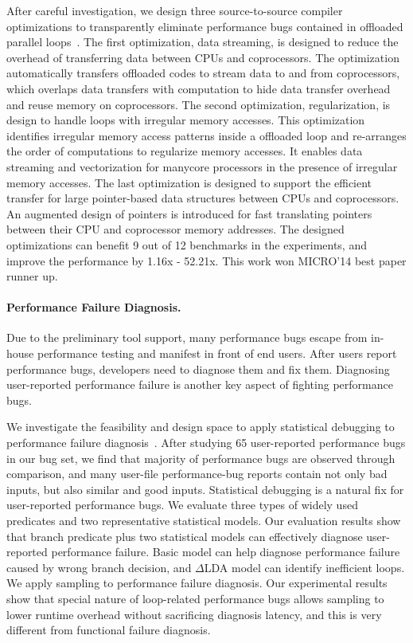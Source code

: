 \documentclass[10pt]{article}
\begin{document}
After careful investigation, we design three source-to-source compiler optimizations to 
transparently eliminate performance bugs contained in offloaded parallel loops~\cite{Song14MICRO}. 
The first optimization, data streaming, is designed to reduce the overhead of transferring data between CPUs and coprocessors. 
The optimization automatically transfers offloaded codes to stream data to and from coprocessors, which overlaps data transfers 
with computation to hide data transfer overhead and reuse memory on coprocessors. 
The second optimization, regularization, is design to handle loops with irregular memory accesses. 
This optimization identifies irregular memory access patterns inside a offloaded loop and re-arranges the order of computations to regularize memory accesses. 
It enables data streaming and vectorization for manycore processors in the presence of irregular memory accesses. 
The last optimization is designed to support the efficient transfer for large pointer-based data structures between CPUs and coprocessors. 
An augmented design of pointers is introduced for fast translating pointers between their CPU and coprocessor memory addresses. 
The designed optimizations can benefit 9 out of 12 benchmarks in the experiments, and improve the performance by 1.16x - 52.21x. 
This work won MICRO'14 best paper runner up. 




\paragraph{Performance Failure Diagnosis.}

Due to the preliminary tool support, many performance bugs escape from in-house performance testing and manifest in front of end users. 
After users report performance bugs, developers need to diagnose them and fix them.
Diagnosing user-reported performance failure is another key aspect of fighting performance bugs. 

We investigate the feasibility and design space to apply statistical debugging to performance failure diagnosis~\cite{Song14OOPSLA}.
After studying 65 user-reported performance bugs in our bug set, 
we find that majority of performance bugs are observed through comparison, 
and many user-file performance-bug reports contain not only bad inputs, but also similar and good inputs.
Statistical debugging is a natural fix for user-reported performance bugs. 
We evaluate three types of widely used predicates and two representative statistical models. 
Our evaluation results show that branch predicate plus two statistical models can effectively diagnose user-reported performance failure. 
Basic model can help diagnose performance failure caused by wrong branch decision, and $\Delta $LDA model can identify inefficient loops.  
We apply sampling to performance failure diagnosis. Our experimental results show that
special nature of loop-related performance bugs allows sampling to lower runtime overhead without sacrificing diagnosis latency, 
and this is very different from functional failure diagnosis.
\end{document}
